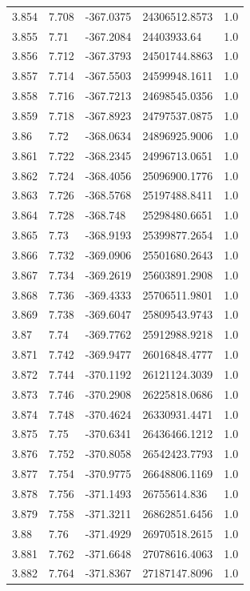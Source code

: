\begin{tabular}{lllll}
3.854 & 7.708 & -367.0375 & 24306512.8573 & 1.0 \\
3.855 & 7.71 & -367.2084 & 24403933.64 & 1.0 \\
3.856 & 7.712 & -367.3793 & 24501744.8863 & 1.0 \\
3.857 & 7.714 & -367.5503 & 24599948.1611 & 1.0 \\
3.858 & 7.716 & -367.7213 & 24698545.0356 & 1.0 \\
3.859 & 7.718 & -367.8923 & 24797537.0875 & 1.0 \\
3.86 & 7.72 & -368.0634 & 24896925.9006 & 1.0 \\
3.861 & 7.722 & -368.2345 & 24996713.0651 & 1.0 \\
3.862 & 7.724 & -368.4056 & 25096900.1776 & 1.0 \\
3.863 & 7.726 & -368.5768 & 25197488.8411 & 1.0 \\
3.864 & 7.728 & -368.748 & 25298480.6651 & 1.0 \\
3.865 & 7.73 & -368.9193 & 25399877.2654 & 1.0 \\
3.866 & 7.732 & -369.0906 & 25501680.2643 & 1.0 \\
3.867 & 7.734 & -369.2619 & 25603891.2908 & 1.0 \\
3.868 & 7.736 & -369.4333 & 25706511.9801 & 1.0 \\
3.869 & 7.738 & -369.6047 & 25809543.9743 & 1.0 \\
3.87 & 7.74 & -369.7762 & 25912988.9218 & 1.0 \\
3.871 & 7.742 & -369.9477 & 26016848.4777 & 1.0 \\
3.872 & 7.744 & -370.1192 & 26121124.3039 & 1.0 \\
3.873 & 7.746 & -370.2908 & 26225818.0686 & 1.0 \\
3.874 & 7.748 & -370.4624 & 26330931.4471 & 1.0 \\
3.875 & 7.75 & -370.6341 & 26436466.1212 & 1.0 \\
3.876 & 7.752 & -370.8058 & 26542423.7793 & 1.0 \\
3.877 & 7.754 & -370.9775 & 26648806.1169 & 1.0 \\
3.878 & 7.756 & -371.1493 & 26755614.836 & 1.0 \\
3.879 & 7.758 & -371.3211 & 26862851.6456 & 1.0 \\
3.88 & 7.76 & -371.4929 & 26970518.2615 & 1.0 \\
3.881 & 7.762 & -371.6648 & 27078616.4063 & 1.0 \\
3.882 & 7.764 & -371.8367 & 27187147.8096 & 1.0 \\

\end{tabular}
